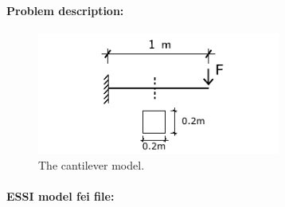 \documentclass[fleqn,11pt]{article}
\begin{document}
\paragraph{Problem description:}

% 
% 
% 

\begin{figure}[!htb]
  \centering
  \includegraphics[width=8cm]{../Figure-files/_Chapter_Appendix_Illustrative_Examples/cantilever.pdf}
  \caption{The cantilever model.}
  \label{fig_cantilever_m5}
\end{figure}


\paragraph{ESSI model fei file: } ~
\end{document}
